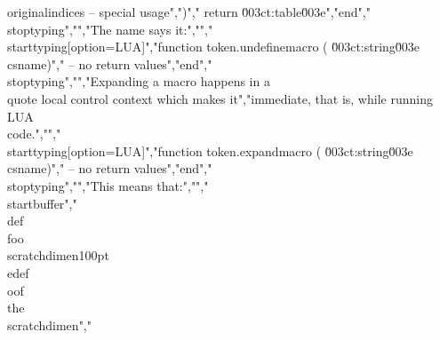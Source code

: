 originalindices -- special usage",")","    return \u003ct:table\u003e","end","\\stoptyping","","The name says it:","","\\starttyping[option=LUA]","function token.undefinemacro ( \u003ct:string\u003e csname)","    -- no return values","end","\\stoptyping","","Expanding a macro happens in a \\quote {local control} context which makes it","immediate, that is, while running \\LUA\\ code.","","\\starttyping[option=LUA]","function token.expandmacro ( \u003ct:string\u003e csname)","    -- no return values","end","\\stoptyping","","This means that:","","\\startbuffer","\\def\\foo{\\scratchdimen100pt \\edef\\oof{\\the\\scratchdimen}}","%
